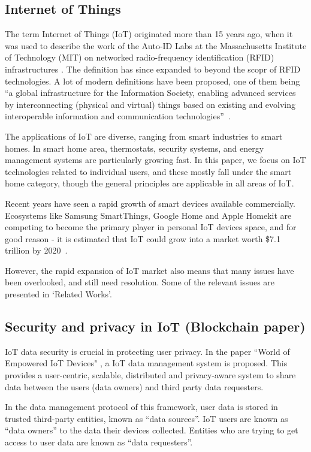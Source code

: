 \subsection{Internet of Things}
The term Internet of Things (IoT) originated more than 15 years ago, when it was used to describe the work of the Auto-ID Labs at the
Massachusetts Institute of Technology (MIT) on networked radio-frequency identification (RFID) infrastructures \cite{atzori}. The definition has since expanded to beyond the scopr of RFID technologies. A lot of modern definitions have been proposed, one of them being ``a global infrastructure for the Information Society, enabling advanced services by interconnecting (physical and virtual) things based on existing and evolving interoperable information and communication technologies''~\cite{itu}.

The applications of IoT are diverse, ranging from smart industries to smart homes. In smart home area, thermostats, security systems, and energy management systems are particularly growing fast. In this paper, we focus on IoT technologies related to individual users, and these mostly fall under the smart home category, though the general principles are applicable in all areas of IoT.

Recent years have seen a rapid growth of smart devices available commercially. Ecosystems like Samsung SmartThings, Google Home and Apple Homekit are competing to become the primary player in personal IoT devices space, and for good reason -  it is estimated that IoT could grow into a market worth \$7.1 trillion by 2020~\cite{idc}.

However, the rapid expansion of IoT market also means that many issues have been overlooked, and still need resolution. Some of the relevant issues are presented in `Related Works'.

\subsection{Security and privacy in IoT (Blockchain paper)}
IoT data security is crucial in protecting user privacy. In the paper ``World of Empowered IoT Devices" \cite{campbell}, a IoT data management system is proposed. This provides a user-centric, scalable, distributed and privacy-aware system to share data between the users (data owners) and third party data requesters.

In the data management protocol of this framework, user data is stored in trusted third-party entities, known as “data sources”. IoT users are known as “data owners” to the data their devices collected. Entities who are trying to get access to user data are known as “data requesters”. 

